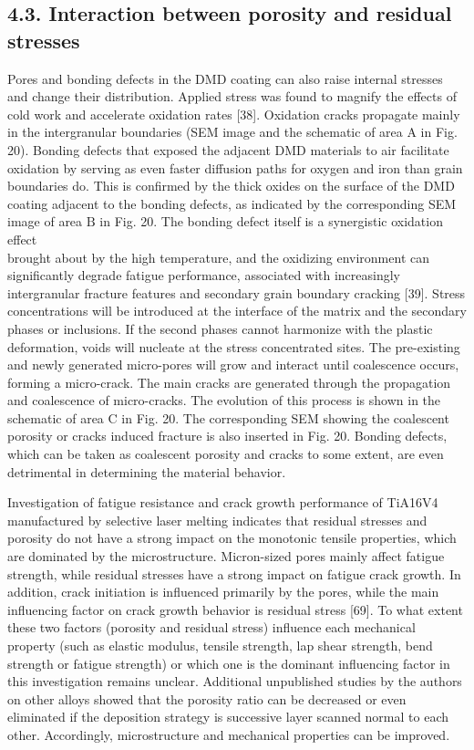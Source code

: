 \documentclass[10pt]{article}
\begin{document}
\subsection*{4.3. Interaction between porosity and residual stresses}
Pores and bonding defects in the DMD coating can also raise internal stresses and change their distribution. Applied stress was found to magnify the effects of cold work and accelerate oxidation rates [38]. Oxidation cracks propagate mainly in the intergranular boundaries (SEM image and the schematic of area A in Fig. 20). Bonding defects that exposed the adjacent DMD materials to air facilitate oxidation by serving as even faster diffusion paths for oxygen and iron than grain boundaries do. This is confirmed by the thick oxides on the surface of the DMD coating adjacent to the bonding defects, as indicated by the corresponding SEM image of area $\mathrm{B}$ in Fig. 20. The bonding defect itself is a synergistic oxidation effect\\
brought about by the high temperature, and the oxidizing environment can significantly degrade fatigue performance, associated with increasingly intergranular fracture features and secondary grain boundary cracking [39]. Stress concentrations will be introduced at the interface of the matrix and the secondary phases or inclusions. If the second phases cannot harmonize with the plastic deformation, voids will nucleate at the stress concentrated sites. The pre-existing and newly generated micro-pores will grow and interact until coalescence occurs, forming a micro-crack. The main cracks are generated through the propagation and coalescence of micro-cracks. The evolution of this process is shown in the schematic of area $\mathrm{C}$ in Fig. 20. The corresponding SEM showing the coalescent porosity or cracks induced fracture is also inserted in Fig. 20. Bonding defects, which can be taken as coalescent porosity and cracks to some extent, are even detrimental in determining the material behavior.

Investigation of fatigue resistance and crack growth performance of TiA16V4 manufactured by selective laser melting indicates that residual stresses and porosity do not have a strong impact on the monotonic tensile properties, which are dominated by the microstructure. Micron-sized pores mainly affect fatigue strength, while residual stresses have a strong impact on fatigue crack growth. In addition, crack initiation is influenced primarily by the pores, while the main influencing factor on crack growth behavior is residual stress [69]. To what extent these two factors (porosity and residual stress) influence each mechanical property (such as elastic modulus, tensile strength, lap shear strength, bend strength or fatigue strength) or which one is the dominant influencing factor in this investigation remains unclear. Additional unpublished studies by the authors on other alloys showed that the porosity ratio can be decreased or even eliminated if the deposition strategy is successive layer scanned normal to each other. Accordingly, microstructure and mechanical properties can be improved.
\end{document}
